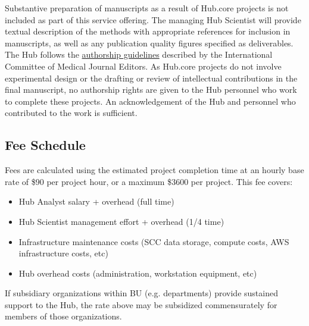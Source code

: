 \documentclass[fleqn,10pt]{wlscirep}
\begin{document}
Substantive preparation of manuscripts as a result of Hub.core projects is not included as part of this service offering.
The managing Hub Scientist will provide textual description of the methods with appropriate references for inclusion in manuscripts, as well as any publication quality figures specified as deliverables.
The Hub follows the \href{http://www.icmje.org/recommendations/browse/roles-and-responsibilities/defining-the-role-of-authors-and-contributors.html}{authorship guidelines} described by the International Committee of Medical Journal Editors.
As Hub.core projects do not involve experimental design or the drafting or review of intellectual contributions in the final manuscript, no authorship rights are given to the Hub personnel who work to complete these projects.
An acknowledgement of the Hub and personnel who contributed to the work is sufficient.

\subsection{Fee Schedule}

Fees are calculated using the estimated project completion time at an hourly base rate of \$90 per project hour, or a maximum \$3600 per project.
This fee covers:

\begin{itemize}
    \item Hub Analyst salary + overhead (full time)
    \item Hub Scientist management effort + overhead (1/4 time)
    \item Infrastructure maintenance costs (SCC data storage, compute costs, AWS infrastructure costs, etc)
    \item Hub overhead costs (administration, workstation equipment, etc)
\end{itemize}

If subsidiary organizations within BU (e.g. departments) provide sustained support to the Hub, the rate above may be subsidized commensurately for members of those organizations.
\end{document}
